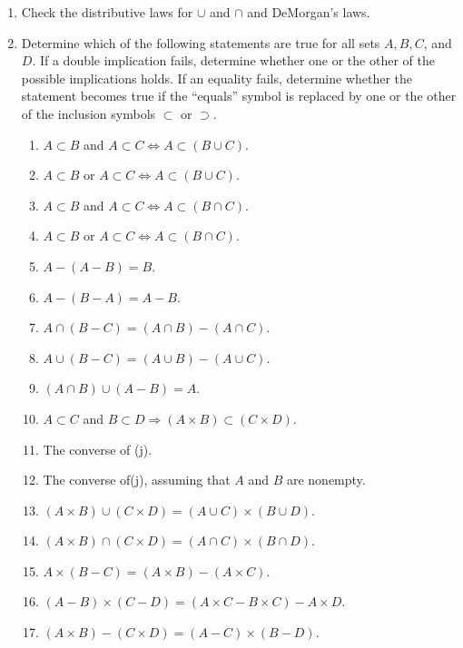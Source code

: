 \begin{enumerate}[itemsep=0.4em, parsep=0pt, topsep=0pt, partopsep=0pt, leftmargin=*, label=\arabic*., ref=\arabic*]
\item Check the distributive laws for \(\cup\) and \(\cap\) and DeMorgan's laws.

\item Determine which of the following statements are true for all sets \(A,B,C\), and \(D\). If a double implication fails, determine whether one or the other of the possible implications holds. If an equality fails, determine whether the statement becomes true if the ``equals'' symbol is replaced by one or the other of the inclusion symbols \(\subset\) or \(\supset\).
  \begin{enumerate}[itemsep=0.2em, parsep=0pt, topsep=0pt, partopsep=0pt, leftmargin=*, label=(\alph*), align=left]
  \item \(A \subset B\) and \(A \subset C \Leftrightarrow A \subset ({B \cup C})\).
  \item \(A \subset B\) or \(A \subset C \Leftrightarrow A \subset ({B \cup C})\).
  \item \(A \subset B\) and \(A \subset C \Leftrightarrow A \subset ({B \cap C})\).
  \item \(A \subset B\) or \(A \subset C \Leftrightarrow A \subset ({B \cap C})\).
  \item \(A - ({A - B}) = B\).
  \item \(A - ({B - A}) = A - B\).
  \item \(A \cap ({B - C}) = ({A \cap B}) - ({A \cap C})\).
  \item \(A \cup ({B - C}) = ({A \cup B}) - ({A \cup C})\).
  \item \(({A \cap B}) \cup ({A - B}) = A\).
  \item \(A \subset C\) and \(B \subset D \Rightarrow ({A \times B}) \subset ({C \times D})\).
  \item The converse of (j).
  \item The converse of(j), assuming that \(A\) and \(B\) are nonempty.
  \item \(({A \times B}) \cup ({C \times D}) = ({A \cup C}) \times ({B \cup D})\).
  \item \(({A \times B}) \cap ({C \times D}) = ({A \cap C}) \times ({B \cap D})\).
  \item \(A \times ({B - C}) = ({A \times B}) - ({A \times C})\).
  \item \(({A - B}) \times ({C - D}) = ({A \times C - B \times C}) - A \times D\).
  \item \(({A \times B}) - ({C \times D}) = ({A - C}) \times ({B - D})\).
  \end{enumerate}


\end{enumerate}
